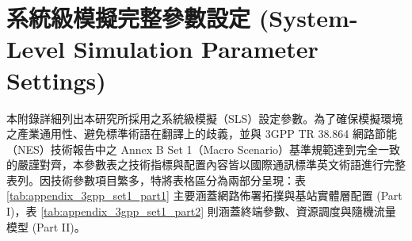 
\appendix
\chapter{系統級模擬完整參數設定 (System-Level Simulation Parameter Settings)}
\label{appendix:A}

本附錄詳細列出本研究所採用之系統級模擬（SLS）設定參數。為了確保模擬環境之產業通用性、避免標準術語在翻譯上的歧義，並與 3GPP TR 38.864 網路節能（NES）技術報告中之 Annex B Set 1（Macro Scenario）基準規範達到完全一致的嚴謹對齊，本參數表之技術指標與配置內容皆以國際通訊標準英文術語進行完整表列。因技術參數項目繁多，特將表格區分為兩部分呈現：表 \ref{tab:appendix_3gpp_set1_part1} 主要涵蓋網路佈署拓撲與基站實體層配置 (Part I)，表 \ref{tab:appendix_3gpp_set1_part2} 則涵蓋終端參數、資源調度與隨機流量模型 (Part II)。

